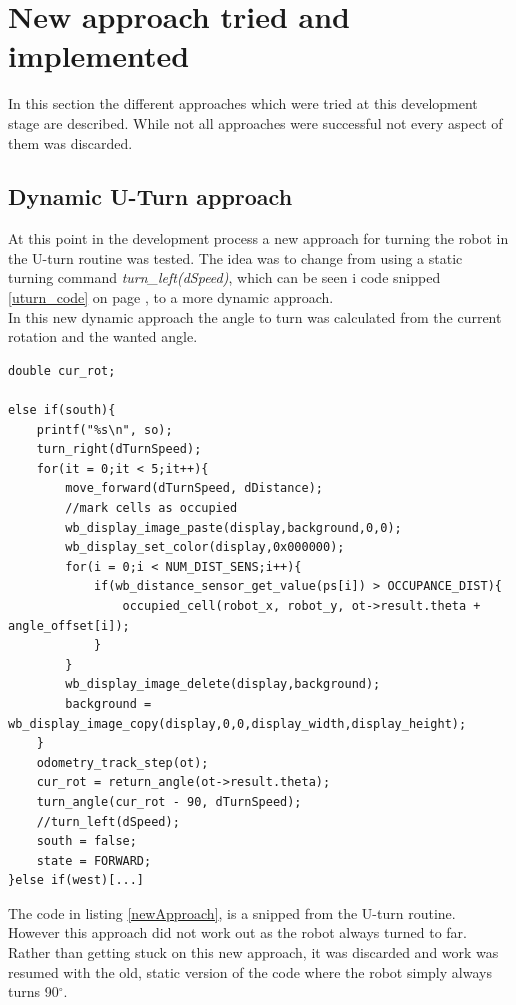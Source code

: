 \section{New approach tried and implemented}
In this section the different approaches which were tried at this development stage are described. While not all approaches were successful not every aspect of them was discarded.

\subsection{Dynamic U-Turn approach}
At this point in the development process a new approach for turning the robot in the U-turn routine was tested. The idea was to change from using a static turning command \textit{turn\_left(dSpeed)}, which can be seen i code snipped \ref{uturn_code} on page \pageref{uturn_code}, to a more dynamic approach. \\
In this new dynamic approach the angle to turn was calculated from the current rotation and the wanted angle.

\begin{lstlisting}[caption={Code snipped of the new approach}, label={newApproach}]
double cur_rot;
    
else if(south){
    printf("%s\n", so);
    turn_right(dTurnSpeed);
    for(it = 0;it < 5;it++){
        move_forward(dTurnSpeed, dDistance);
        //mark cells as occupied
        wb_display_image_paste(display,background,0,0);
        wb_display_set_color(display,0x000000);
        for(i = 0;i < NUM_DIST_SENS;i++){
            if(wb_distance_sensor_get_value(ps[i]) > OCCUPANCE_DIST){
                occupied_cell(robot_x, robot_y, ot->result.theta + angle_offset[i]);
            }
        }
        wb_display_image_delete(display,background);
        background = wb_display_image_copy(display,0,0,display_width,display_height);
    }
    odometry_track_step(ot);
    cur_rot = return_angle(ot->result.theta);
    turn_angle(cur_rot - 90, dTurnSpeed);
    //turn_left(dSpeed);
    south = false;
    state = FORWARD;
}else if(west)[...]
\end{lstlisting}

The code in listing \ref{newApproach}, is a snipped from the U-turn routine. \\
However this approach did not work out as the robot always turned to far. Rather than getting stuck on this new approach, it was discarded and work was resumed with the old, static version of the code where the robot simply always turns 90$^{\circ}$. \\

